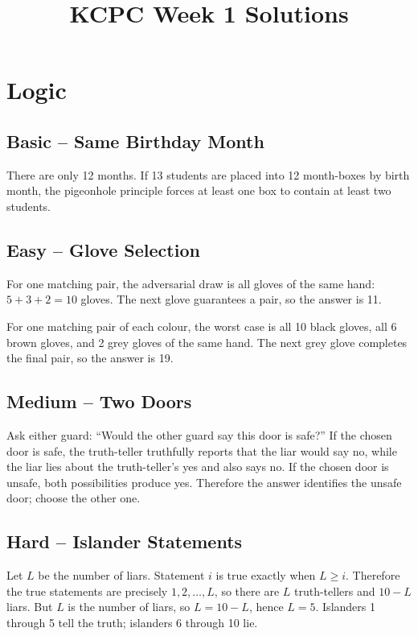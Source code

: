 \documentclass[12pt]{article}
\title{KCPC Week 1 Solutions}
\author{}
\date{}
\begin{document}
\maketitle
\thispagestyle{fancy}

\section{Logic}

\subsection*{Basic -- Same Birthday Month}
There are only 12 months. If 13 students are placed into 12
month-boxes by birth month, the pigeonhole principle forces at least
one box to contain at least two students.

\subsection*{Easy -- Glove Selection}
For one matching pair, the adversarial draw is all gloves of the same
hand: $5+3+2=10$ gloves. The next glove guarantees a pair, so the answer is 11.

For one matching pair of each colour, the worst case is all 10 black
gloves, all 6 brown gloves, and 2 grey gloves of the same hand. The
next grey glove completes the final pair, so the answer is 19.

\subsection*{Medium -- Two Doors}
Ask either guard: ``Would the other guard say this door is safe?'' If
the chosen door is safe, the truth-teller truthfully reports that the
liar would say no, while the liar lies about the truth-teller's yes
and also says no. If the chosen door is unsafe, both possibilities
produce yes. Therefore the answer identifies the unsafe door; choose
the other one.

\subsection*{Hard -- Islander Statements}
Let $L$ be the number of liars. Statement $i$ is true exactly when
$L\ge i$. Therefore the true statements are precisely $1,2,\ldots,L$,
so there are $L$ truth-tellers and $10-L$ liars. But $L$ is the
number of liars, so $L=10-L$, hence $L=5$. Islanders 1 through 5 tell
the truth; islanders 6 through 10 lie.
\end{document}
